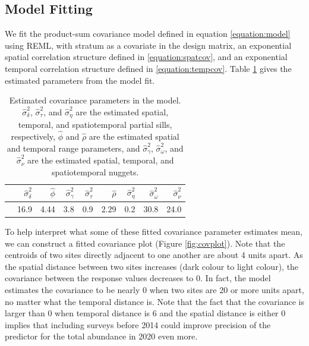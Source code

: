 \documentclass[]{interact}
\theoremstyle{plain}%
\theoremstyle{definition}
\theoremstyle{remark}
\begin{document}
\subsection{Model Fitting} \label{subsection:modelfit}

We fit the product-sum covariance model defined in equation
\ref{equation:model} using REML, with stratum as a covariate in the
design matrix, an exponential spatial correlation structure defined in
\ref{equation:spatcov}, and an exponential temporal correlation
structure defined in \ref{equation:tempcov}. Table \ref{paramest} gives
the estimated parameters from the model fit.

\begin{table}[ht]
\centering
\begin{tabular}{rrrrrrrrr}
  \hline
 & $\hat{\sigma}^2_{\delta}$ & $\hat{\phi}$ & $\hat{\sigma}^2_{\gamma}$ & $\hat{\sigma}^2_{\tau}$ & $\hat{\rho}$ & $\hat{\sigma}^2_{\eta}$ & $\hat{\sigma}^2_{\omega}$ & $\hat{\sigma}^2_{\nu}$ \\ 
  \hline
 & 16.9 & 4.44 & 3.8 & 0.9 & 2.29 & 0.2 & 30.8 & 24.0 \\ 
   \hline
\end{tabular}
\caption{Estimated covariance parameters in the model. $\hat{\sigma}^2_{\delta}$, $\hat{\sigma}^2_{\tau}$, and $\hat{\sigma}^2_{\eta}$ are the estimated spatial, temporal, and spatiotemporal partial sills, respectively, $\hat{\phi}$ and $\hat{\rho}$ are the estimated spatial and temporal range parameters, and $\hat{\sigma}^2_{\gamma}$, $\hat{\sigma}^2_{\omega}$, and $\hat{\sigma}^2_{\nu}$ are the estimated spatial, temporal, and spatiotemporal nuggets.} 
\label{paramest}
\end{table}

To help interpret what some of these fitted covariance parameter
estimates mean, we can construct a fitted covariance plot (Figure
\ref{fig:covplot}). Note that the centroids of two sites directly
adjacent to one another are about 4 units apart. As the spatial distance
between two sites increases (dark colour to light colour), the
covariance between the response values decreases to 0. In fact, the
model estimates the covariance to be nearly 0 when two sites are 20 or
more units apart, no matter what the temporal distance is. Note that the
fact that the covariance is larger than 0 when temporal distance is 6
and the spatial distance is either 0 implies that including surveys
before 2014 could improve precision of the predictor for the total
abundance in 2020 even more.
\end{document}
